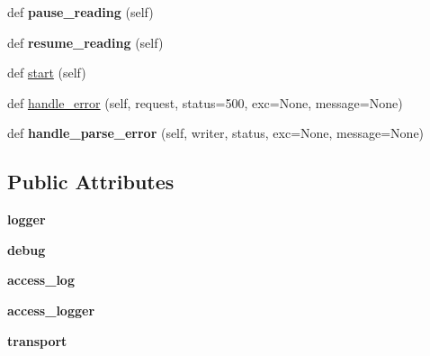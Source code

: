 \begin{DoxyCompactItemize}
\item 
\mbox{\label{classaiohttp_1_1web__protocol_1_1_request_handler_a5a19491269d519249841276325a5a12c}} 
def {\bfseries pause\+\_\+reading} (self)
\item 
\mbox{\label{classaiohttp_1_1web__protocol_1_1_request_handler_a514422a904a45e29a82c8c084f26bd35}} 
def {\bfseries resume\+\_\+reading} (self)
\item 
def \hyperlink{classaiohttp_1_1web__protocol_1_1_request_handler_a9360c259487f6581c6a979e9c1031e68}{start} (self)
\item 
def \hyperlink{classaiohttp_1_1web__protocol_1_1_request_handler_aa66bb9cd253f5f10045b14649f4ea570}{handle\+\_\+error} (self, request, status=500, exc=None, message=None)
\item 
\mbox{\label{classaiohttp_1_1web__protocol_1_1_request_handler_a96ab9bc10a024b69cb68914ed891c8c9}} 
def {\bfseries handle\+\_\+parse\+\_\+error} (self, writer, status, exc=None, message=None)
\end{DoxyCompactItemize}
\subsection*{Public Attributes}
\begin{DoxyCompactItemize}
\item 
\mbox{\label{classaiohttp_1_1web__protocol_1_1_request_handler_a5c39ae124dfeffb715bbd42752fa340b}} 
{\bfseries logger}
\item 
\mbox{\label{classaiohttp_1_1web__protocol_1_1_request_handler_a74b033940c7eaebff6690510cd863678}} 
{\bfseries debug}
\item 
\mbox{\label{classaiohttp_1_1web__protocol_1_1_request_handler_abe8fb907c006144a10f627c8f97f84ed}} 
{\bfseries access\+\_\+log}
\item 
\mbox{\label{classaiohttp_1_1web__protocol_1_1_request_handler_a8662c67cdf94456b824bbf4fb985a6a1}} 
{\bfseries access\+\_\+logger}
\item 
\mbox{\label{classaiohttp_1_1web__protocol_1_1_request_handler_afd50c4aebce51c36a035d7b751b6b210}} 
{\bfseries transport}
\end{DoxyCompactItemize}
